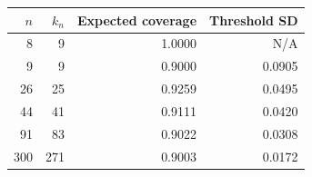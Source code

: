 \begin{tabular}{rrrr}
\toprule
$n$ & $k_n$ & Expected coverage & Threshold SD \\
\midrule
8 & 9 & 1.0000 & N/A \\
9 & 9 & 0.9000 & 0.0905 \\
26 & 25 & 0.9259 & 0.0495 \\
44 & 41 & 0.9111 & 0.0420 \\
91 & 83 & 0.9022 & 0.0308 \\
300 & 271 & 0.9003 & 0.0172 \\
\bottomrule
\end{tabular}
